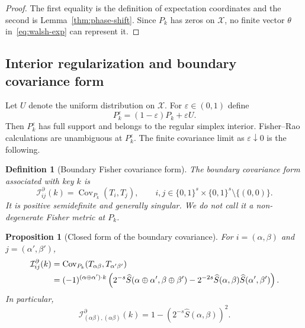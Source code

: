 \documentclass[referee,lineno,pdflatex,sn-mathphys-num]{sn-jnl}
\theoremstyle{thmstylethree}
\newtheorem{definition}{Definition}[section]
\theoremstyle{thmstyletwo}
\theoremstyle{thmstyleone}
\newtheorem{proposition}{Proposition}[section]
\newcommand{\B}[1]{\{0,1\}^{#1}}
\begin{document}
\begin{proof}
The first equality is the definition of expectation coordinates and the second
is Lemma~\ref{thm:phase-shift}.  Since $P_k$ has zeros on $\mathcal X$, no
finite vector $\theta$ in~\eqref{eq:walsh-exp} can represent it.
\end{proof}

\subsection{Interior regularization and boundary covariance form}\label{subsec:fim}

Let $U$ denote the uniform distribution on $\mathcal X$.  For
$\varepsilon\in(0,1)$ define
\begin{equation}\label{eq:eps-reg}
  P_k^{\varepsilon}=(1-\varepsilon)P_k+\varepsilon U.
\end{equation}
Then $P_k^{\varepsilon}$ has full support and belongs to the regular simplex
interior.  Fisher--Rao calculations are unambiguous at $P_k^{\varepsilon}$.
The finite covariance limit as $\varepsilon\downarrow0$ is the following.

\begin{definition}[Boundary Fisher covariance form]\label{def:boundary-fisher}
The boundary covariance form associated with key $k$ is
\begin{equation}\label{eq:boundary-fisher}
  \mathcal I^{\partial}_{ij}(k)=\operatorname{Cov}_{P_k}(T_i,T_j),
  \qquad i,j\in\B{s}\times\B{s}\setminus\{(0,0)\}.
\end{equation}
It is positive semidefinite and generally singular.  We do not call it a
non-degenerate Fisher metric at $P_k$.
\end{definition}

\begin{proposition}[Closed form of the boundary covariance]\label{thm:fim}
For $i=(\alpha,\beta)$ and $j=(\alpha',\beta')$,
\begin{align}
  \mathcal I^{\partial}_{ij}(k)
  &=\operatorname{Cov}_{P_k}(T_{\alpha\beta},T_{\alpha'\beta'})\notag\\
  &=(-1)^{(\alpha\oplus\alpha')\cdot k}
  \left(
  2^{-s}\widehat S(\alpha\oplus\alpha',\beta\oplus\beta')
  -2^{-2s}\widehat S(\alpha,\beta)\widehat S(\alpha',\beta')
  \right).\label{eq:fim-full}
\end{align}
In particular,
\begin{equation}\label{eq:fim-diag}
  \mathcal I^{\partial}_{(\alpha\beta),(\alpha\beta)}(k)
  =1-\left(2^{-s}\widehat S(\alpha,\beta)\right)^2.
\end{equation}
\end{proposition}
\end{document}
